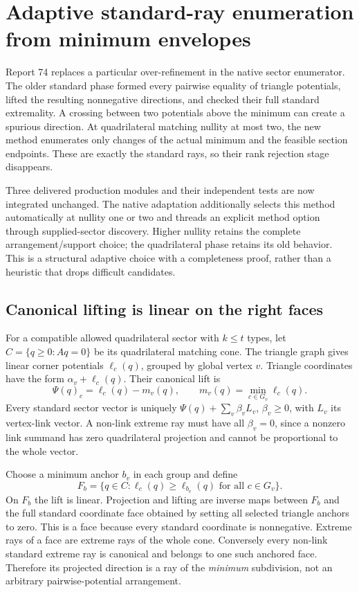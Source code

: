 \section{Adaptive standard-ray enumeration from minimum envelopes}
\label{sec:minimum-envelopes-native}

Report 74 replaces a particular over-refinement in the native sector
enumerator. The older standard phase formed every pairwise equality of
triangle potentials, lifted the resulting nonnegative directions, and checked
their full standard extremality. A crossing between two potentials above
the minimum can create a spurious direction. At quadrilateral matching
nullity at most two, the new method enumerates only changes of the actual
minimum and the feasible section endpoints. These are exactly the standard
rays, so their rank rejection stage disappears.

Three delivered production modules and their independent tests are now
integrated unchanged. The native adaptation additionally selects this method
automatically at nullity one or two and threads an explicit method option
through supplied-sector discovery. Higher nullity retains the complete
arrangement/support choice; the quadrilateral phase retains its old behavior.
This is a structural adaptive choice with a completeness proof, rather than
a heuristic that drops difficult candidates.

\subsection{Canonical lifting is linear on the right faces}

For a compatible allowed quadrilateral sector with $k\le t$ types, let
$C=\{q\ge0:Aq=0\}$ be its quadrilateral matching cone. The triangle graph
gives linear corner potentials $\ell_c(q)$, grouped by global vertex $v$.
Triangle coordinates have the form $\alpha_v+\ell_c(q)$. Their canonical
lift is
\[
 \Psi(q)_c=\ell_c(q)-m_v(q),\qquad
 m_v(q)=\min_{c\in G_v}\ell_c(q).
\]
Every standard sector vector is uniquely $\Psi(q)+\sum_v\beta_v L_v$,
$\beta_v\ge0$, with $L_v$ its vertex-link vector. A non-link extreme ray
must have all $\beta_v=0$, since a nonzero link summand has zero quadrilateral
projection and cannot be proportional to the whole vector.

Choose a minimum anchor $b_v$ in each group and define
\[
 F_b=\{q\in C:\ell_c(q)\ge\ell_{b_v}(q)\text{ for all }c\in G_v\}.
\]
On $F_b$ the lift is linear. Projection and lifting are inverse maps between
$F_b$ and the full standard coordinate face obtained by setting all selected
triangle anchors to zero. This is a face because every standard coordinate
is nonnegative. Extreme rays of a face are extreme rays of the whole cone.
Conversely every non-link standard extreme ray is canonical and belongs to
one such anchored face. Therefore its projected direction is a ray of the
\emph{minimum} subdivision, not an arbitrary pairwise-potential arrangement.

